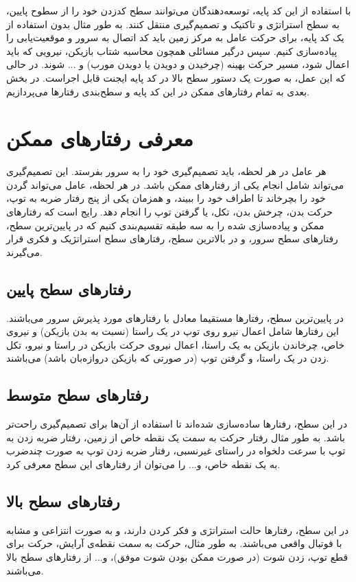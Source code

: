 با استفاده از این کد پایه، توسعه‌دهندگان می‌توانند سطح کدزدن خود را از سطوح پایین، به سطح استراتژی و تاکتیک و تصمیم‌گیری منتقل کنند. به طور مثال
بدون استفاده از یک کد پایه، برای حرکت عامل به مرکز زمین باید کد اتصال به سرور و موقعیت‌یابی را پیاده‌سازی کنیم. سپس درگیر مسائلی همچون محاسبه شتاب بازیکن، نیرویی که باید اعمال شود، مسیر حرکت بهینه (چرخیدن و دویدن یا دویدن مورب)
 و ... شوند. در حالی که این عمل، به صورت یک دستور سطح بالا در کد پایه ایجنت قابل اجراست. در بخش بعدی به تمام رفتار‌های ممکن در این کد پایه و سطح‌بندی رفتار‌ها می‌پردازیم.

\section{معرفی رفتار‌های ممکن}
هر عامل در هر لحظه، باید تصمیم‌گیری خود را به سرور بفرستد.
این تصمیم‌گیری می‌تواند شامل انجام یکی از رفتار‌های ممکن باشد.
در هر لحظه، عامل می‌تواند گردن خود را بچرخاند تا اطراف خود را ببیند، و همزمان یکی از پنج رفتار ضربه به توپ، حرکت بدن، چرخش بدن، تکل، یا گرفتن توپ را انجام دهد.
رایج است که رفتار‌های ممکن و پیاده‌سازی شده را به سه طبقه تقسیم‌بندی کنیم که در پایین‌ترین سطح، رفتار‌های سطح‌ سرور، و در بالا‌ترین سطح، رفتار‌های سطح استراتژیک و فکری
قرار می‌گیرند.
\subsection{رفتار‌های سطح پایین}
در پایین‌ترین سطح، رفتار‌ها مستقیما معادل با رفتار‌های مورد پذیرش سرور می‌باشند.
این رفتار‌ها شامل اعمال نیرو روی توپ در یک راستا (نسبت به بدن بازیکن)
 و نیروی خاص، 
 چرخاندن بازیکن به یک راستا،
اعمال نیروی حرکت بازیکن در راستا و نیرو،
تکل زدن در یک راستا،
و گرفتن توپ (در صورتی که بازیکن دروازه‌بان باشد)
می‌باشند.

\subsection{رفتار‌های سطح متوسط}
در این سطح، رفتار‌ها ساده‌سازی شده‌اند تا استفاده‌ از آن‌ها برای تصمیم‌گیری راحت‌تر باشد. 
به طور مثال رفتار حرکت به سمت یک نقطه‌ خاص از زمین،
رفتار ضربه زدن به توپ با سرعت دلخواه در راستای غیرنسبی،
رفتار ضربه زدن توپ به صورت چند‌ضرب به یک نقطه خاص،
و...
را می‌توان از رفتار‌های این سطح معرفی کرد.
\subsection{رفتار‌های سطح بالا}
در این سطح، رفتار‌ها حالت استراتژی و فکر کردن دارند، و به صورت انتزاعی و مشابه با فوتبال واقعی می‌باشند.
به طور مثال، حرکت به سمت نقطه‌ی آرایش،
حرکت برای قطع توپ،
زدن شوت (در صورت ممکن بودن شوت موفق)،
و...
از رفتار‌های سطح بالا می‌باشند.
